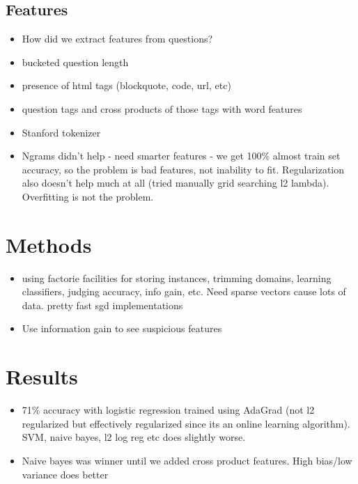 \documentclass[11pt]{article}
\begin{document}
\subsection{Features}
\begin{itemize}
\item How did we extract features from questions?
\item bucketed question length
\item presence of html tags (blockquote, code, url, etc)
\item question tags and cross products of those tags with word features
\item Stanford tokenizer 
\item Ngrams didn’t help - need smarter features - we get 100\% almost train set accuracy, so the problem is bad features, not inability to fit. Regularization also doesn’t help much at all (tried manually grid searching l2 lambda). Overfitting is not the problem.
\end{itemize}

\section{Methods}
\begin{itemize}
\item using factorie facilities for storing instances, trimming domains, learning classifiers, judging accuracy, info gain, etc. Need sparse vectors cause lots of data. pretty fast sgd implementations
\item Use information gain to see suspicious features
\end{itemize}

\section{Results}
\begin{itemize}
\item 71\% accuracy with logistic regression trained using AdaGrad (not l2 regularized but effectively regularized since its an online learning algorithm). SVM, naive bayes, l2 log reg etc does slightly worse. 
\item Naive bayes was winner until we added cross product features. High bias/low variance does better
\end{itemize}
\end{document}
